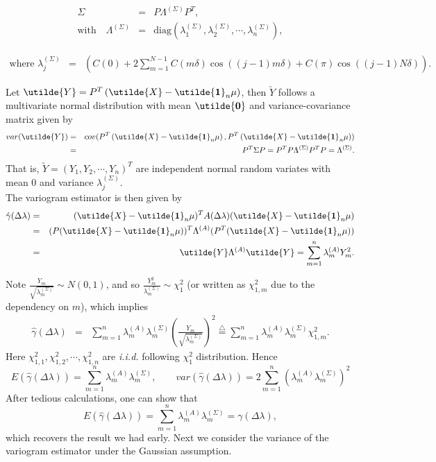 \begin{eqnarray*}
\Sigma &=& P \Lambda^{(\Sigma)} P^T,\\
\mbox{with}\quad \Lambda^{(\Sigma)} &=& \mbox{diag}(\lambda_1^{(\Sigma)}, \lambda_2^{(\Sigma)}, \cdots, \lambda_n^{(\Sigma)}),
\end{eqnarray*}

\begin{eqnarray*}
\mbox{where }\lambda_j^{(\Sigma)} &=& \left(C(0) + 2\sum_{m = 1}^{N-1}C(m\delta)\cos((j-1)m\delta) + C(\pi)\cos((j-1)N\delta)\right).
\end{eqnarray*}

Let $\utilde{Y} = P^T\left(\utilde{X} - \utilde{\bf 1}_n \mu \right)$, then $\utilde{Y}$ follows a multivariate normal distribution with mean $\utilde{\bf 0}$ and variance-covariance matrix given by
\begin{eqnarray*}
var(\utilde{Y}) &=& cov(P^T\left(\utilde{X} - \utilde{\bf 1}_n \mu \right), P^T\left(\utilde{X} - \utilde{\bf 1}_n \mu \right)) \\
&=& P^T \Sigma P  = P^T P \Lambda^{(\Sigma)} P^T P = \Lambda^{(\Sigma)}.
\end{eqnarray*}
That is, $\utilde{Y} = (Y_1, Y_2, \cdots, Y_n)^T$ are independent normal random variates with mean 0 and variance $\lambda_j^{(\Sigma)}$. \\

The variogram estimator is then given by
\begin{eqnarray*}
\hat{\gamma}(\Delta \lambda) &=& (\utilde{X}-\utilde{\bf 1}_n\mu)^T A(\Delta \lambda)(\utilde{X}-\utilde{\bf 1}_n\mu) \\
&=& (P(\utilde{X}-\utilde{\bf 1}_n\mu))^T \Lambda^{(A)} (P^T(\utilde{X}-\utilde{\bf 1}_n\mu))  \\
&=& \utilde{Y} \Lambda^{(A)} \utilde{Y} = \sum_{m = 1}^n \lambda_m^{(A)} Y_m^2.
\end{eqnarray*}

Note $\frac{Y_m}{\sqrt{\lambda_m^{(\Sigma)}}} \sim N(0, 1)$, and so $\frac{Y_m^2}{\lambda_m^{(\Sigma)}} \sim \chi_1^2$ (or written as $\chi_{1, m}^2$ due to the dependency on $m$), which implies
\begin{eqnarray*}
\hat{\gamma}(\Delta \lambda) &=& \sum_{m = 1}^n \lambda_m^{(A)} \lambda_m^{(\Sigma)} \left(\frac{Y_m}{\sqrt{\lambda_m^{(\Sigma)}}}\right)^2 \stackrel{\triangle}{=} \sum_{m = 1}^n \lambda_m^{(A)} \lambda_m^{(\Sigma)} \chi_{1,m}^2.
\end{eqnarray*}
Here $\chi_{1, 1}^2, \chi_{1, 2}^2, \cdots, \chi_{1, n}^2$ are {\em i.i.d.} following $\chi_1^2$ distribution. Hence
\[
E(\hat{\gamma}(\Delta \lambda)) = \sum_{m = 1}^n \lambda_m^{(A)} \lambda_m^{(\Sigma)}, \quad \quad var(\hat{\gamma}(\Delta \lambda)) = 2 \sum_{m = 1}^n (\lambda_m^{(A)} \lambda_m^{(\Sigma)})^2
\]
After tedious calculations, one can show that
\[
E(\hat{\gamma}(\Delta \lambda)) = \sum_{m = 1}^n \lambda_m^{(A)} \lambda_m^{(\Sigma)} = \gamma(\Delta \lambda),
\]
which recovers the result we had early. Next we consider the variance of the variogram estimator under the Gaussian assumption. \\

